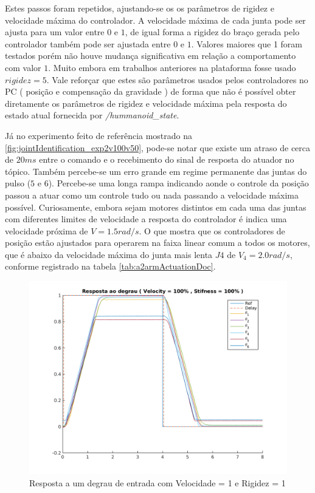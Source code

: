 Estes passos foram repetidos, ajustando-se os os parâmetros de rigidez e velocidade máxima do controlador. A velocidade máxima de cada junta pode ser ajusta para um valor entre $0$ e $1$, de igual forma a rigidez do braço gerada pelo controlador também pode ser ajustada entre $0$ e $1$. Valores maiores que 1 foram testados porém não houve mudança significativa em relação a comportamento com valor $1$. Muito embora em trabalhos anteriores na plataforma fosse usado $rigidez = 5$. Vale reforçar que estes são parâmetros usados pelos controladores no PC ( posição e compensação da gravidade ) de forma que não é possível obter diretamente os parâmetros de rigidez e velocidade máxima pela resposta do estado atual fornecida por \textit{/hummanoid\_state}.

Já no experimento feito de referência mostrado na \ref{fig:jointIdentification_exp2v100v50}, pode-se notar que existe um atraso de cerca de $20ms$ entre o comando e o recebimento do sinal de resposta do atuador no tópico. Também percebe-se um erro grande em regime permanente das juntas do pulso ($5$ e $6$). Percebe-se uma longa rampa indicando aonde o controle da posição passou a atuar como um controle tudo ou nada passando a velocidade máxima possível. Curiosamente, embora sejam motores distintos em cada uma das juntas com diferentes limites de velocidade a resposta do controlador é indica uma velocidade próxima de $V = 1.5 rad/s$. O que mostra que os controladores de posição estão ajustados para operarem na faixa linear comum a todos os motores, que é abaixo da velocidade máxima do junta mais lenta $J4$ de $V_4 = 2.0 rad/s$, conforme registrado na tabela \ref{tab:a2armActuationDoc}.

\begin{figure}[H]
    \centering
    \includegraphics[width=0.8\linewidth]{tex/figs/jointIdentification_exp1v100v100.png}
    \caption{Resposta a um degrau de entrada com Velocidade = 1 e Rigidez = 1}
    \label{fig:jointIdentification_exp1v100v100}
\end{figure}


